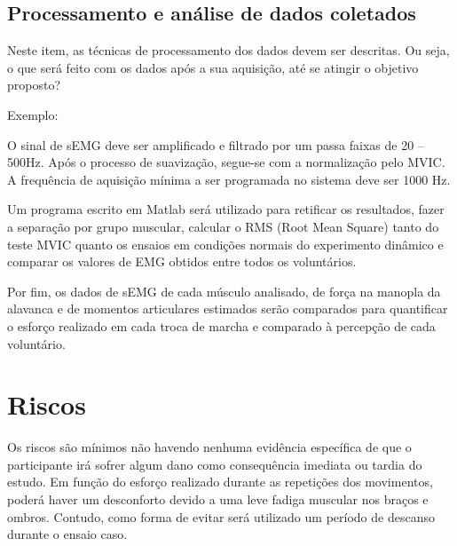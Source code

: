 \documentclass[rascunho,xindy]{Classe-Latex-FEI/fei}
\begin{document}
\section{Processamento e análise de dados coletados}

Neste item, as técnicas de processamento dos dados devem ser descritas. Ou seja, o que será feito com os dados após a sua aquisição, até se atingir o objetivo proposto?

Exemplo:

O sinal de sEMG deve ser amplificado e filtrado por um passa faixas de 20 – 500Hz. Após o processo de suavização, segue-se com a normalização pelo MVIC. A frequência de aquisição mínima a ser programada no sistema deve ser 1000 Hz.

Um programa escrito em Matlab será utilizado para retificar os resultados, fazer a separação por grupo muscular, calcular o RMS (Root Mean Square) tanto do teste MVIC quanto os ensaios em condições normais do experimento dinâmico e comparar os valores de EMG obtidos entre todos os voluntários.

Por fim, os dados de sEMG de cada músculo analisado, de força na manopla da alavanca e de momentos articulares estimados serão comparados para quantificar o esforço realizado em cada troca de marcha e comparado à percepção de cada voluntário.

\chapter{Riscos}

Os riscos são mínimos não havendo nenhuma evidência específica de que o participante irá sofrer algum dano como consequência imediata ou tardia do estudo. Em função do esforço realizado durante as repetições dos movimentos, poderá haver um desconforto devido a uma leve fadiga muscular nos braços e ombros. Contudo, como forma de evitar será utilizado um período de descanso durante o ensaio caso.
\end{document}

